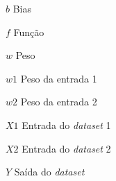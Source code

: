 
\begin{simbolos} \itemsep -1pt
	\item[$ b $] Bias
	\item[$ f $] Função
	\item[$ w $] Peso
	\item[$ w1 $] Peso da entrada 1
	\item[$ w2 $] Peso da entrada 2
	\item[$ X1 $] Entrada do \textit{dataset} 1
	\item[$ X2 $] Entrada do \textit{dataset} 2
	\item[$ Y $] Saída do \textit{dataset}
	
\end{simbolos}
